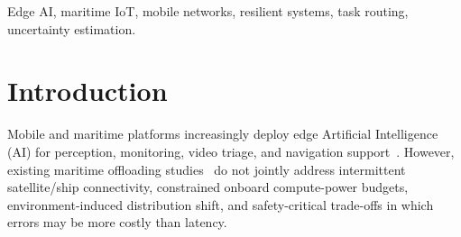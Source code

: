 \documentclass[10pt, conference]{IEEEtran}
\begin{document}
\begin{abstract}
 Mobile and maritime edge AI systems face intermittent connectivity, constrained onboard computation, and distribution shifts caused by sea state, illumination, and occlusion. This paper shows that softmax confidence can increase as accuracy decreases under maritime image degradation, making confidence-threshold offloading unreliable. To address this issue, \textsc{CONFROUTE} introduces a lightweight three-way routing framework that selects local inference, peer/relay forwarding, or conservative fallback based on confidence, queue load, urgency, and link quality. Experiments on 37,500 tasks using the \textit{Ships in Satellite Imagery} dataset and maritime link traces show that, under degraded connectivity, \textsc{CONFROUTE} reduces unsafe outcomes from $6.8\%$ to $4.8\%$ relative to always-offload execution. The findings indicate that uncertainty calibration is the key bottleneck for resilient maritime edge AI.

\end{abstract}

\begin{IEEEkeywords}
Edge AI, maritime IoT, mobile networks, resilient systems, task routing, uncertainty estimation.
\end{IEEEkeywords}

\section{Introduction}
Mobile and maritime platforms increasingly deploy edge Artificial Intelligence (AI) for perception, monitoring, video triage, and navigation support~\cite{yang2022mab_maritime}. However, existing maritime offloading studies~\cite{yang2022mab_maritime, you2025joint_maritime, he2025distributed_maritime, kong2025satd3_maritime, ning2025marho} do not jointly address intermittent satellite/ship connectivity, constrained onboard compute-power budgets, environment-induced distribution shift, and safety-critical trade-offs in which errors may be more costly than latency.
\end{document}
